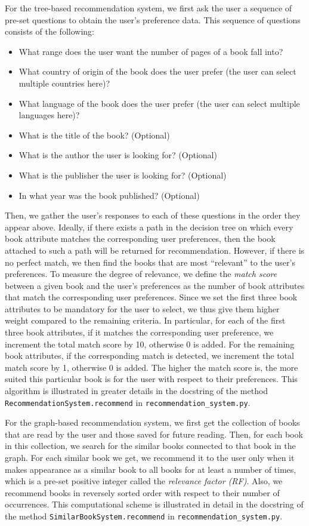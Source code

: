 \documentclass[fontsize=11pt]{article}
\begin{document}
\begin{itemize}
\begin{itemize}
    For the tree-based recommendation system, we first ask the user a sequence of pre-set questions to obtain the user's preference data. This sequence of questions consists of the following:
    \begin{itemize}
        \item What range does the user want the number of pages of a book fall into?
        \item What country of origin of the book does the user prefer (the user can select multiple countries here)?
        \item What language of the book does the user prefer (the user can select multiple languages here)?
        \item What is the title of the book? (Optional)
        \item What is the author the user is looking for? (Optional)
        \item What is the publisher the user is looking for? (Optional)
        \item In what year was the book published? (Optional)
    \end{itemize}
    Then, we gather the user's responses to each of these questions in the order they appear above. Ideally, if there exists a path in the decision tree on which every book attribute matches the corresponding user preferences, then the book attached to such a path will be returned for recommendation. However, if there is no perfect match, we then find the books that are most ``relevant'' to the user's preferences. To measure the degree of relevance, we define the \textit{match score} between a given book and the user's preferences as the number of book attributes that match the corresponding user preferences. Since we set the first three book attributes to be mandatory for the user to select, we thus give them higher weight compared to the remaining criteria. In particular, for each of the first three book attributes, if it matches the corresponding user preference, we increment the total match score by 10, otherwise 0 is added. For the remaining book attributes, if the corresponding match is detected, we increment the total match score by 1, otherwise 0 is added. The higher the match score is, the more suited this particular book is for the user with respect to their preferences. This algorithm is illustrated in greater details in the docstring of the method \texttt{RecommendationSystem.recommend} in \texttt{recommendation\_system.py}.

    For the graph-based recommendation system, we first get the collection of books that are read by the user and those saved for future reading. Then, for each book in this collection, we search for the similar books connected to that book in the graph. For each similar book we get, we recommend it to the user only when it makes appearance as a similar book to all books for at least a number of times, which is a pre-set positive integer called the \textit{relevance factor (RF)}. Also, we recommend books in reversely sorted order with respect to their number of occurrences. This computational scheme is illustrated in detail in the docstring of the method \texttt{SimilarBookSystem.recommend} in \texttt{recommendation\_system.py}.


\end{itemize}
\end{itemize}
\end{document}
